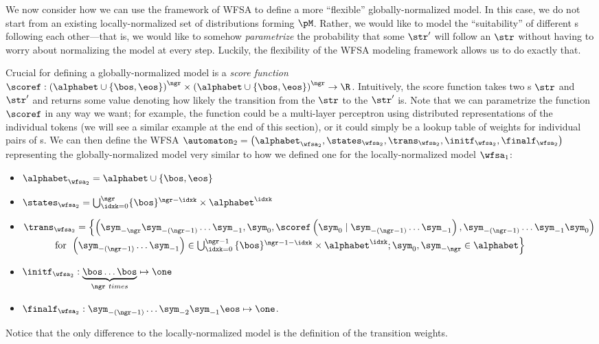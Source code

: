 We now consider how we can use the framework of WFSA to define a more ``flexible'' globally-normalized model.
In this case, we do not start from an existing locally-normalized set of distributions forming $\pM$.
Rather, we would like to model the ``suitability'' of different \ngram{}s following each other---that is, we would like to somehow \emph{parametrize} the probability that some \ngram{} $\str'$ will follow an \ngram{} $\str$ without having to worry about normalizing the model at every step.
Luckily, the flexibility of the WFSA modeling framework allows us to do exactly that.

Crucial for defining a globally-normalized model is a \emph{score function} $\scoref: \left(\alphabet \cup \{\bos, \eos\}\right)^\ngr \times \left(\alphabet \cup \{\bos, \eos\}\right)^\ngr \to \R$.
Intuitively, the score function takes two \ngram{}s $\str$ and $\str'$ and returns some value denoting how likely the transition from the \ngram{} $\str$ to the \ngram{} $\str'$ is.
Note that we can parametrize the function $\scoref$ in any way we want; for example, the function could be a multi-layer perceptron using distributed representations of the individual tokens (we will see a similar example at the end of this section), or it could simply be a lookup table of weights for individual pairs of \ngram{}s.
We can then define the WFSA $\automaton_2 = \left(\alphabet_{\wfsa_2}, \states_{\wfsa_2}, \trans_{\wfsa_2}, \initf_{\wfsa_2}, \finalf_{\wfsa_2}\right)$ representing the globally-normalized model very similar to how we defined one for the locally-normalized model $\wfsa_1$:
\begin{itemize}
    \item $\alphabet_{\wfsa_2} = \alphabet \cup \{\bos, \eos\}$
    \item $\states_{\wfsa_2} = \bigcup_{\idxk = 0}^{\ngr} \{\bos\}^{\ngr-\idxk} \times \alphabet^{\idxk}$
    \item $\trans_{\wfsa_2} = \left\{ \left(\sym_{-\ngr} \sym_{-(\ngr - 1)} \dots \sym_{-1}, \sym_{0} , \scoref \left( \sym_{0} \mid \sym_{-(\ngr - 1)} \dots \sym_{-1} \right), \sym_{-(\ngr - 1)} \dots \sym_{-1} \sym_{0} \right) \right.$
    $\quad \quad \quad \text{ for }\left. \left( \sym_{-(\ngr - 1)} \dots \sym_{-1} \right) \in \bigcup_{\idxk = 0}^{\ngr-1}{\{\bos\}^{\ngr-1-\idxk} \times \alphabet^{\idxk}; \sym_{0}, \sym_{-\ngr} \in \alphabet } \vphantom{\left(\sym_{-\ngr} \sym_{-(\ngr - 1)} \dots \sym_{-1}, \sym_{0} , \scoref \left( \sym_{0} \mid \sym_{-(\ngr - 1)} \dots \sym_{-1} \right), \sym_{-(\ngr - 1)} \dots \sym_{-1} \sym_{0} \right)} \right\}$
    \item $\initf_{\wfsa_2}: \underbrace{\bos \dots \bos}_{\ngr \  times} \mapsto \one$
    \item $\finalf_{\wfsa_2}: \sym_{-(\ngr - 1)} \dots \sym_{-2} \sym_{-1} \eos \mapsto \one $.
\end{itemize}
Notice that the only difference to the locally-normalized model is the definition of the transition weights.

